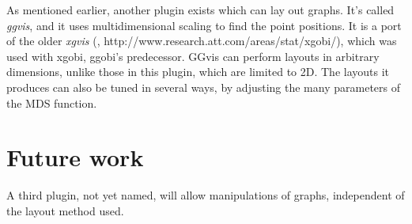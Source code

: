 \documentclass[11pt]{article}
\begin{document}
As mentioned earlier, another plugin exists which can lay out
graphs.  It's called {\em ggvis}, and it uses multidimensional
scaling to find the point positions.  It is a port of the older
{\em xgvis} (\cite{xgvis_jcgs2002}, http://www.research.att.com/areas/stat/xgobi/), which
was used with xgobi, ggobi's predecessor.  GGvis can perform
layouts in arbitrary dimensions, unlike those in this plugin,
which are limited to 2D.  The layouts it produces can also
be tuned in several ways, by adjusting the many parameters of
the MDS function.

\section{Future work}

A third plugin, not yet named, will allow manipulations of
graphs, independent of the layout method used.


\end{document}

